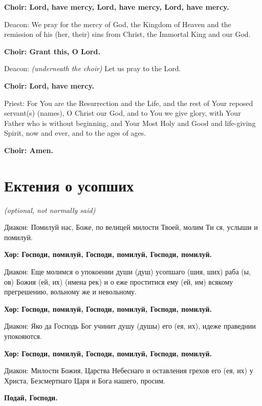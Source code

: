 \documentclass[12pt,a4paper,titlepage]{report}
\begin{document}
\begin{paracol}[1]{2}
	\textbf{Choir: Lord, have mercy, Lord, have mercy, Lord, have mercy.}
	
	Deacon: We pray for the mercy of God, the Kingdom of Heaven and the remission of his (her, their) sins from Christ, the Immortal King and our God.
	
	\textbf{Choir: Grant this, O Lord.}
	
	Deacon: \textit{(underneath the choir)} Let us pray to the Lord.
	
	\textbf{Choir: Lord, have mercy.}
	
	Priest: For You are the Resurrection and the Life, and the rest of Your reposed servant(s) (names), O Christ our God, and to You we give glory, with Your Father who is without beginning, and Your Most Holy and Good and life-giving Spirit, now and ever, and to the ages of ages.
	
	\textbf{Choir: Amen.}
	
	\switchcolumn[1]
	
	\section*{Ектения о усопших}
	
	\indent \textit {\foreignlanguage{english}{(optional, not normally said)}}
	
	Диакон: Помилуй нас, Боже, по велицей милости Твоей, молим Ти ся, услыши и помилуй.
	
	\textbf{Хор: Господи, помилуй, Господи, помилуй, Господи, помилуй.}
	
	Диакон: Еще молимся о упокоении души (душ) усопшаго (шия, ших) раба (ы, ов) Божия (ей, их) (имена рек) и о еже проститися ему (ей, им) всякому прегрешению, вольному же и невольному.
	
	\textbf{Хор: Господи, помилуй, Господи, помилуй, Господи, помилуй.}
	
	Диакон: Яко да Господь Бог учинит душу (душы) его (ея, их), идеже праведнии упокояются.
	
	\textbf{Хор: Господи, помилуй, Господи, помилуй, Господи, помилуй.}
	
	Диакон: Милости Божия, Царства Небеснаго и оставления грехов его (ея, их) у Христа, Безсмертнаго Царя и Бога нашего, просим.
	
	\textbf{Подай, Господи.}
	

\end{paracol}
\end{document}
